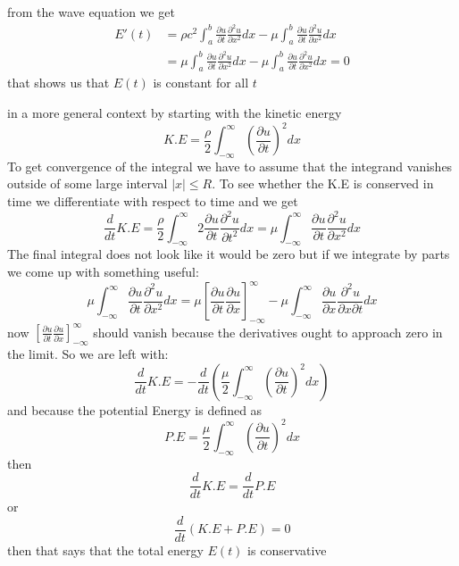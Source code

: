 \documentclass[]{article}
\begin{document}
from the wave equation we get 
\begin{align*}
    E'(t) &= \rho c^2 \int_{a}^{b} \frac{\partial u}{\partial t}\frac{\partial^2 u}{\partial x^2} dx -\mu \int_{a}^{b} \frac{\partial u}{\partial t}\frac{\partial^2 u}{\partial x^2} dx    
    \\
    &= \mu \int_{a}^{b} \frac{\partial u}{\partial t}\frac{\partial^2 u}{\partial x^2} dx -\mu \int_{a}^{b} \frac{\partial u}{\partial t}\frac{\partial^2 u}{\partial x^2} dx = 0
\end{align*}
that shows us that $E(t)$ is constant for all $t$
\par
in a more general context by starting with the kinetic energy
\[
K.E = \frac{\rho}{2} \int_{-\infty}^{\infty} {\left(\frac{\partial u}{\partial t}\right)}^2 dx    
\]
To get convergence of the integral we have to assume that the integrand vanishes
outside of some large interval $|x| \leq R$.
To see whether the K.E is conserved in time
we differentiate with respect to time and we get
\[
\frac{d}{dt}K.E = \frac{\rho}{2} \int_{-\infty}^{\infty} 2\frac{\partial u}{\partial t}\frac{\partial^2 u}{\partial t^2} dx = \mu \int_{-\infty}^{\infty} \frac{\partial u}{\partial t}\frac{\partial^2 u}{\partial x^2} dx
\]
The final integral does not look like it would be zero but if we integrate by
parts we come up with something useful:
\[
    \mu \int_{-\infty}^{\infty} \frac{\partial u}{\partial t}\frac{\partial^2 u}{\partial x^2} dx = \mu \left[\frac{\partial u}{\partial t}\frac{\partial u}{\partial x}\right]_{-\infty}^{\infty} - \mu \int_{-\infty}^{\infty} \frac{\partial u}{\partial x}\frac{\partial^2 u}{\partial x \partial t} dx
\]
now $\displaystyle \left[\frac{\partial u}{\partial t}\frac{\partial u}{\partial x}\right]_{-\infty}^{\infty} $ should vanish because the derivatives ought to approach zero in the limit. So we are left with:
\[
\frac{d}{dt}K.E = -\frac{d}{dt}\left(\frac{\mu}{2} \int_{-\infty}^{\infty} {\left(\frac{\partial u}{\partial t}\right)}^2 dx\right)
\]
and because the potential Energy is defined as 
\[
P.E = \frac{\mu}{2} \int_{-\infty}^{\infty} {\left(\frac{\partial u}{\partial t}\right)}^2 dx
\]
then 
\[
   \frac{d}{dt}K.E = \frac{d}{dt}P.E 
\]
or 
\[
\frac{d}{dt} \left(K.E + P.E \right) = 0    
\]
then that says that the total energy $E(t)$ is conservative
\end{document}
